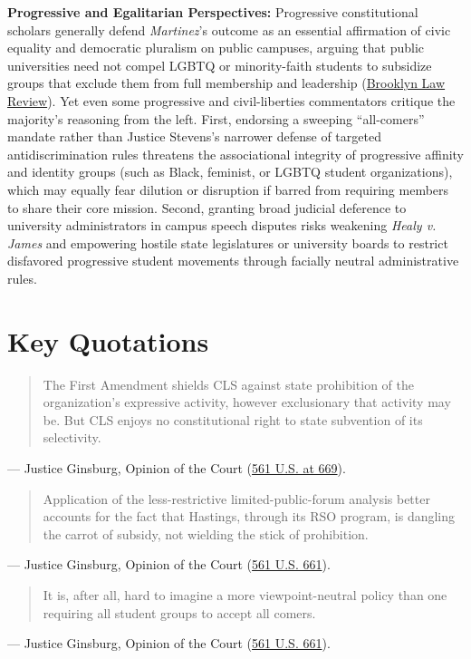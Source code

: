 \documentclass[12pt]{article}
\begin{document}
\textbf{Progressive and Egalitarian Perspectives:} Progressive constitutional scholars generally defend \textit{Martinez}'s outcome as an essential affirmation of civic equality and democratic pluralism on public campuses, arguing that public universities need not compel LGBTQ or minority-faith students to subsidize groups that exclude them from full membership and leadership (\href{https://brooklynworks.brooklaw.edu/cgi/viewcontent.cgi?article=1051&context=blr}{Brooklyn Law Review}). Yet even some progressive and civil-liberties commentators critique the majority's reasoning from the left. First, endorsing a sweeping ``all-comers'' mandate rather than Justice Stevens's narrower defense of targeted antidiscrimination rules threatens the associational integrity of progressive affinity and identity groups (such as Black, feminist, or LGBTQ student organizations), which may equally fear dilution or disruption if barred from requiring members to share their core mission. Second, granting broad judicial deference to university administrators in campus speech disputes risks weakening \textit{Healy v. James} and empowering hostile state legislatures or university boards to restrict disfavored progressive student movements through facially neutral administrative rules.

\section{Key Quotations}

\begin{quote}
The First Amendment shields CLS against state prohibition of the organization's expressive activity, however exclusionary that activity may be. But CLS enjoys no constitutional right to state subvention of its selectivity.
\end{quote}
\noindent --- Justice Ginsburg, Opinion of the Court (\href{https://supreme.justia.com/cases/federal/us/561/661/}{561 U.S. at 669}).

\begin{quote}
Application of the less-restrictive limited-public-forum analysis better accounts for the fact that Hastings, through its RSO program, is dangling the carrot of subsidy, not wielding the stick of prohibition.
\end{quote}
\noindent --- Justice Ginsburg, Opinion of the Court (\href{https://supreme.justia.com/cases/federal/us/561/661/}{561 U.S. 661}).

\begin{quote}
It is, after all, hard to imagine a more viewpoint-neutral policy than one requiring all student groups to accept all comers.
\end{quote}
\noindent --- Justice Ginsburg, Opinion of the Court (\href{https://supreme.justia.com/cases/federal/us/561/661/}{561 U.S. 661}).
\end{document}
